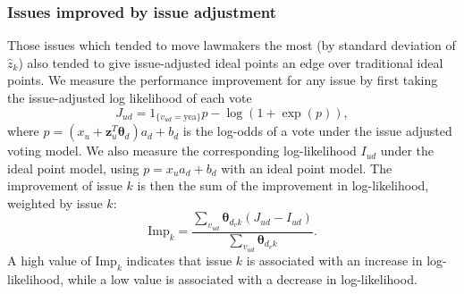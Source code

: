 \subsubsection{Issues improved by issue adjustment}
Those issues which tended to move lawmakers the most (by standard
deviation of $\hat z_k$) also tended to give issue-adjusted ideal
points an edge over traditional ideal points.  We measure the
performance improvement for any issue by first taking the
issue-adjusted log likelihood of each vote
\begin{equation}
  J_{ud} = 1_{\{v_{ud} = \mbox{yea}\}} p - \log(1 + \exp(p)),
\end{equation}
where $p = (x_u + \bm z_{u}^T \bm \theta_d ) a_d + b_d$ is the
log-odds of a vote under the issue adjusted voting model.  We also
measure the corresponding log-likelihood $I_{ud}$ under the ideal
point model, using $p=x_u a_d + b_d$ with an ideal point model. The
improvement of issue $k$ is then the sum of the improvement in
log-likelihood, weighted by issue $k$:
\begin{equation}
  \label{eq:likelihood_improvement}
  \mbox{Imp}_k = \frac{\sum_{v_{ud}} \bm \theta_{d_v k} (J_{ud} - I_{ud}) }
       { \sum_{v_{ud}} \bm \theta_{d_v k} }.
\end{equation}
A high value of $\mbox{Imp}_k$ indicates that issue $k$ is associated
with an increase in log-likelihood, while a low value is associated
with a decrease in log-likelihood.

